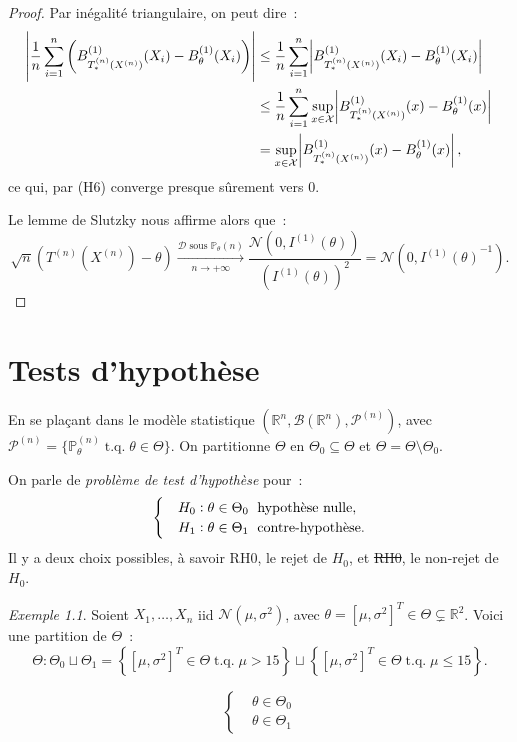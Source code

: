 \documentclass{report}
\DeclareMathOperator{\tq}{\text{ t.q. }}
\renewcommand{\P}{\mathbb P}
\newcommand{\pinfty}{{+\infty}}
\newcommand{\statmod}[4]{\left(#1^{#4}, #2\left(#1^{#4}\right), #3^{\left(#4\right)}\right)}
\newcommand{\Nms}{\mathcal N(\mu, \sigma^2)}
\newcommand{\R}{\mathbb R}
\newcommand{\Brl}{\mathcal B}  %
\newcommand{\n}{{(n)}}
\newcommand{\Xn}{{X^\n}}
\newcommand{\Tn}{{T^\n}}
\newcommand{\TnXn}{{\Tn(\Xn)}}
\theoremstyle{definition}
\theoremstyle{remark}
\newtheorem{ex}{Exemple}[chapter]
\begin{document}
\begin{proof}
			Par inégalité triangulaire, on peut dire~:
			\begin{align*}
				\abs {\frac 1n \sum_{i=1}^n\left(B_{T_*^{(n)}(\Xn)}^{(1)}(X_i) - B_\theta^{(1)}(X_i)\right)}
					&\leq \frac 1n\sum_{i=1}^n\abs {B_{T_*^{(n)}(\Xn)}^{(1)}(X_i) - B_\theta^{(1)}(X_i)} \\
				&\leq \frac 1n\sum_{i=1}^n\sup_{x \in \mathcal X}\abs {B_{T_*^{(n)}(\Xn)}^{(1)}(x) - B_\theta^{(1)}(x)} \\
				&= \sup_{x \in \mathcal X}\abs {B_{T_*^{(n)}(\Xn)}^{(1)}(x) - B_\theta^{(1)}(x)},
			\end{align*}
			ce qui, par (H6) converge presque sûrement vers 0.

			Le lemme de Slutzky nous affirme alors que~:
			\[\sqrt n\left(\TnXn - \theta\right) \xrightarrow[n \to \pinfty]{\mathcal D \text{ sous } \P_\theta{(n)}}
				\frac {\mathcal N(0, I^{(1)}(\theta))}{\left(I^{(1)}(\theta)\right)^2} = \mathcal N(0, {I^{(1)}(\theta)}^{-1}).\]
			\end{proof}

\chapter{Tests d'hypothèse}
	En se plaçant dans le modèle statistique $\statmod \R\Brl{\mathcal P}n$, avec $\mathcal P^{(n)} = \{\P_\theta^{(n)} \tq \theta \in \Theta\}$. On partitionne
	$\Theta$ en $\Theta_0 \subseteq \Theta$ et $\Theta = \Theta \setminus \Theta_0$.

	On parle de \textit{problème de test d'hypothèse} pour~:
	\[\begin{cases}
		&H_0 : \theta \in \Theta_0 \text{\; hypothèse nulle}, \\
		&H_1 : \theta \in \Theta_1 \text{\; contre-hypothèse}.
	\end{cases}\]
	Il y a deux choix possibles, à savoir RH0, le rejet de $H_0$, et \sout {RH0}, le non-rejet de $H_0$.

	\begin{ex} Soient $X_1, \ldots, X_n$ iid $\Nms$, avec $\theta = [\mu, \sigma^2]^T \in \Theta \subsetneq \R^2$. Voici une partition de $\Theta$~:
	\[\Theta : \Theta_0 \sqcup \Theta_1 = \left\{[\mu, \sigma^2]^T \in \Theta \tq \mu > 15\right\}
		\sqcup \left\{[\mu, \sigma^2]^T \in \Theta \tq \mu \leq 15\right\}.\]

	\[\begin{cases}
		&\theta \in \Theta_0 \\
		&\theta \in \Theta_1
	\end{cases}\]
	\end{ex}
\end{document}
